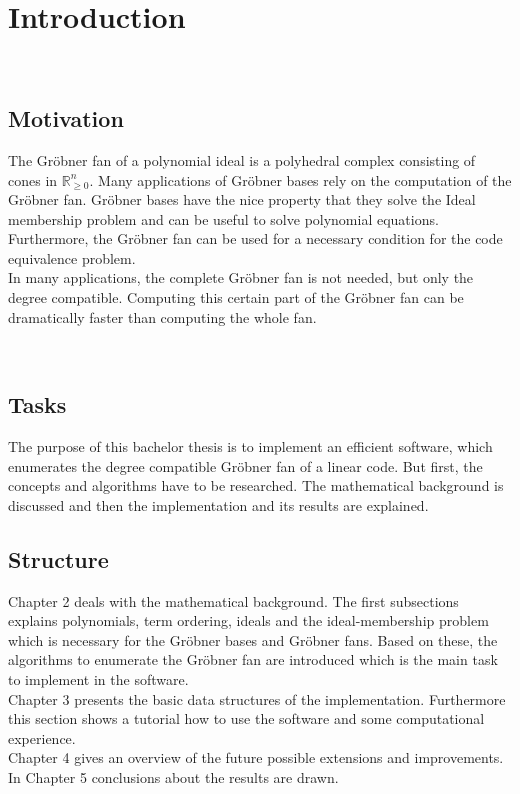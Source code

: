 \section{Introduction}

~\\
\subsection{Motivation}
The Gröbner fan of a polynomial ideal is a polyhedral complex consisting of cones in $\mathbb{R}_{\geq 0}^{n}$.
Many applications of Gröbner bases rely on the computation of the Gröbner fan.
Gröbner bases have the nice property that they solve the Ideal membership problem and can be useful to solve polynomial equations.
Furthermore, the Gröbner fan can be used for a necessary condition for the code equivalence problem. \\
In many applications, the complete Gröbner fan is not needed, but only the degree compatible. 
Computing this certain part of the Gröbner fan can be dramatically faster than computing the whole fan.

~\\

\subsection{Tasks}
The purpose of this bachelor thesis is to implement an efficient software, which enumerates the degree compatible Gröbner fan of a linear code. But first, the concepts and algorithms have to be researched. The mathematical background is discussed and then the implementation and its results are explained. 

\newpage

\subsection{Structure}
Chapter 2 deals with the mathematical background. The first subsections explains polynomials, term ordering, ideals and the ideal-membership problem which is necessary for the Gröbner bases and Gröbner fans. Based on these, the algorithms to enumerate the Gröbner fan are introduced which is the main task to implement in the software.\\
Chapter 3 presents the basic data structures of the implementation. Furthermore this section shows a tutorial how to use the software and some computational experience.\\
Chapter 4 gives an overview of the future possible extensions and improvements.\\
In Chapter 5 conclusions about the results are drawn.
\newpage